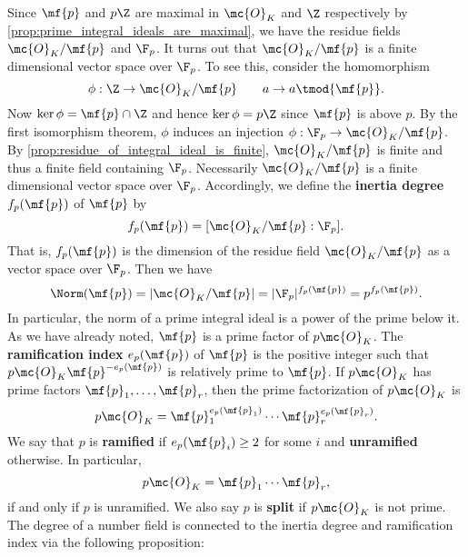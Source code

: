     Since $\mf{p}$ and $p\Z$ are maximal in $\mc{O}_{K}$ and $\Z$ respectively by \cref{prop:prime_integral_ideals_are_maximal}, we have the residue fields $\mc{O}_{K}/\mf{p}$ and $\F_{p}$. It turns out that $\mc{O}_{K}/\mf{p}$ is a finite dimensional vector space over $\F_{p}$. To see this, consider the homomorphism
    \[
      \phi:\Z \to \mc{O}_{K}/\mf{p} \qquad a \to a \tmod{\mf{p}}.
    \]
    Now $\ker\phi = \mf{p} \cap \Z$ and hence $\ker\phi = p\Z$ since $\mf{p}$ is above $p$. By the first isomorphism theorem, $\phi$ induces an injection $\phi:\F_{p} \to \mc{O}_{K}/\mf{p}$. By \cref{prop:residue_of_integral_ideal_is_finite}, $\mc{O}_{K}/\mf{p}$ is finite and thus a finite field containing $\F_{p}$. Necessarily $\mc{O}_{K}/\mf{p}$ is a finite dimensional vector space over $\F_{p}$. Accordingly, we define the \textbf{inertia degree} $f_{p}(\mf{p})$ of $\mf{p}$ by
    \[
      f_{p}(\mf{p}) = [\mc{O}_{K}/\mf{p}:\F_{p}].
    \]
    That is, $f_{p}(\mf{p})$ is the dimension of the residue field $\mc{O}_{K}/\mf{p}$ as a vector space over $\F_{p}$. Then we have
    \[
      \Norm(\mf{p}) = |\mc{O}_{K}/\mf{p}| = |\F_{p}|^{f_{p}(\mf{p})} = p^{f_{p}(\mf{p})}.
    \]
    In particular, the norm of a prime integral ideal is a power of the prime below it. As we have already noted, $\mf{p}$ is a prime factor of $p\mc{O}_{K}$. The \textbf{ramification index} $e_{p}(\mf{p})$ of $\mf{p}$ is the positive integer such that $p\mc{O}_{K}\mf{p}^{-e_{p}(\mf{p})}$ is relatively prime to $\mf{p}$. If $p\mc{O}_{K}$ has prime factors $\mf{p}_{1},\ldots,\mf{p}_{r}$, then the prime factorization of $p\mc{O}_{K}$ is
    \[
      p\mc{O}_{K} = \mf{p}_{1}^{e_{p}(\mf{p}_{1})} \cdots \mf{p}_{r}^{e_{p}(\mf{p}_{r})}.
    \]
    We say that $p$ is \textbf{ramified} if $e_{p}(\mf{p}_{i}) \ge 2$ for some $i$ and \textbf{unramified} otherwise. In particular,
    \[
      p\mc{O}_{K} = \mf{p}_{1} \cdots \mf{p}_{r},
    \]
    if and only if $p$ is unramified. We also say $p$ is \textbf{split} if $p\mc{O}_{K}$ is not prime. The degree of a number field is connected to the inertia degree and ramification index via the following proposition:

